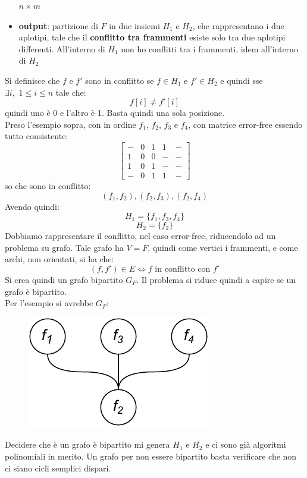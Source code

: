 \documentclass[a4paper,12pt, oneside]{book}
\begin{document}
\begin{esempio}
\begin{itemize}
    $n\times m$
    \item \textbf{output}: partizione di $F$ in due insiemi $H_1$ e $H_2$, che
    rappresentano i due aplotipi, tale che il \textbf{conflitto tra frammenti}
    esiste solo tra due aplotipi differenti. All'interno di $H_1$ non ho
    conflitti tra i frammenti, idem all'interno di $H_2$
  \end{itemize}
  Si definisce che $f$ e $f'$ sono in
  conflitto se $f\in H_1$ e $f'\in H_2$ e quindi sse $\exists i, \,\,1\leq
  i\leq n$ tale che:
  \[f[i]\neq f'[i]\]
  quindi uno è 0 e l'altro è 1. Basta quindi una sola posizione.\\
  Preso l'esempio sopra, con in ordine $f_1$, $f_2$, $f_3$ e $f_4$, con
  matrice error-free essendo tutto consistente:
  \[
    \left[
      \begin{matrix}
        - & 0 & 1 & 1 &-\\
        1 & 0 & 0 & - &-\\
        1 & 0 & 1 & - &-\\
        - & 0 & 1 & 1 &-
      \end{matrix}
    \right]
  \]
  so che sono in conflitto:
  \[(f_1,f_2), (f_2,f_3), (f_2,f_4)\]
  Avendo quindi:
  \[H_1=\{f_1,f_3,f_4\}\]
  \[H_2=\{f_2\}\]
  Dobbiamo rappresentare il conflitto, nel caso error-free, riducendolo ad un
  problema su grafo. Tale grafo ha $V=F$, quindi come vertici i frammenti, e
  come archi, non orientati, si ha che:
  \[(f,f')\in E \iff f\mbox{ in conflitto con } f'\]
  Si crea quindi un grafo bipartito $G_F$. Il problema si riduce quindi a capire se un
  grafo è bipartito.\\
  Per l'esempio si avrebbe $G_F$:
  \begin{figure}[H]
    \centering
    \includegraphics[scale = 1]{img/gp.pdf}
  \end{figure}
  Decidere che è un grafo è bipartito mi genera $H_1$ e $H_2$ e ci sono già
  algoritmi polinomiali in merito. Un grafo per non essere bipartito basta
  verificare che non ci siano cicli semplici dispari.\\

\end{esempio}
\end{document}
